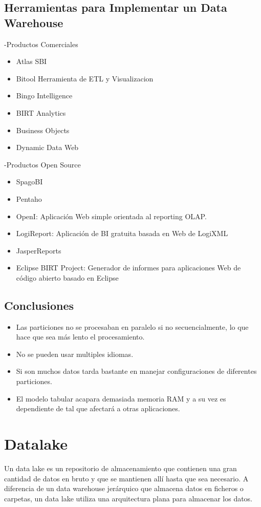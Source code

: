 \documentclass[preprint,12pt]{elsarticle}
\begin{document}
\subsection{Herramientas para Implementar un Data Warehouse}

-Productos Comerciales
\begin{itemize}
	\item Atlas SBI
	\item Bitool Herramienta de ETL y Visualizacion
	\item Bingo Intelligence
	\item BIRT Analytics	
	\item Business Objects	
	\item Dynamic Data Web	
\end{itemize}
-Productos Open Source
\begin{itemize}
	\item SpagoBI
	\item Pentaho
	\item OpenI: Aplicación Web simple orientada al reporting OLAP.
	\item LogiReport: Aplicación de BI gratuita basada en Web de LogiXML	
	\item JasperReports	
	\item Eclipse BIRT Project: Generador de informes para aplicaciones Web de código abierto basado en Eclipse	
\end{itemize}
\subsection{Conclusiones}
\begin{itemize}
	\item Las particiones no se procesaban en paralelo si no secuencialmente, lo que hace que sea más lento el procesamiento.
	\item No se pueden usar multiples idiomas.
	\item Si son muchos datos tarda bastante en manejar configuraciones de diferentes particiones.
	\item El modelo tabular acapara demasiada memoria RAM y a su vez es dependiente de tal que afectará a otras aplicaciones.
\end{itemize}

\section{Datalake}

Un data lake es un repositorio de almacenamiento que contienen una gran cantidad de datos en bruto y que se mantienen allí hasta que sea necesario. A diferencia de un data warehouse jerárquico que almacena datos en ficheros o carpetas, un data lake utiliza una arquitectura plana para almacenar los datos.\\
\end{document}
